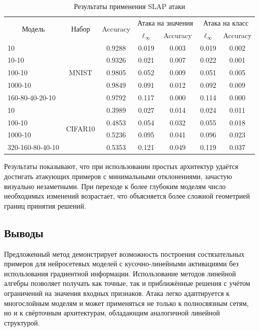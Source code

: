 \begin{table} [htbp]
\centering
\begin{threeparttable}
\caption{Результаты применения SLAP атаки}\label{tab:slap}
\begin{SingleSpace}
\begin{tabular}{|l|c|c|c|c|c|c|}
\hline
\multicolumn{1}{|c|}{\multirow{2}{*}{Модель}} &
\multicolumn{1}{|c|}{\multirow{2}{*}{Набор}} &
\multicolumn{1}{|c|}{\multirow{2}{*}{Accuracy}} &
\multicolumn{2}{c|}{Атака на значения} & \multicolumn{2}{c|}{Атака на класс} \\
\cline{4-7}
& & & \(\ell_\infty\) & Accuracy & \(\ell_\infty\) & Accuracy \\
\hline
10               & \multirow{5}{*}{MNIST} & 0.9288 & 0.019 & 0.003 & 0.019 & 0.002 \\
10-10            &                        & 0.9326 & 0.021 & 0.007 & 0.022 & 0.001 \\
100-10           &                        & 0.9805 & 0.052 & 0.009 & 0.051 & 0.005 \\
1000-10          &                        & 0.9849 & 0.091 & 0.012 & 0.092 & 0.009 \\
160-80-40-20-10  &                        & 0.9792 & 0.117 & 0.000 & 0.114 & 0.000 \\
\hline
10               & \multirow{4}{*}{CIFAR10} & 0.3989 & 0.027 & 0.014 & 0.024 & 0.011 \\
100-10           &                          & 0.4853 & 0.054 & 0.032 & 0.055 & 0.018 \\
1000-10          &                          & 0.5236 & 0.095 & 0.041 & 0.096 & 0.023 \\
320-160-80-40-10 &                          & 0.5353 & 0.121 & 0.049 & 0.119 & 0.037 \\
\hline
\end{tabular}
\end{SingleSpace}
\end{threeparttable}
\end{table}

Результаты показывают, что при использовании простых архитектур удаётся достигать атакующих примеров с минимальными отклонениями, зачастую визуально незаметными. При переходе к более глубоким моделям число необходимых изменений возрастает, что объясняется более сложной геометрией границ принятия решений.

\subsection{Выводы}

Предложенный метод демонстрирует возможность построения состязательных примеров для нейросетевых моделей с кусочно-линейными активациями без использования градиентной информации. Использование методов линейной алгебры позволяет получать как точные, так и приближённые решения с учётом ограничений на значения входных признаков. Атака легко адаптируется к многослойным моделям и может применяться не только к полносвязным сетям, но и к свёрточным архитектурам, обладающим аналогичной линейной структурой.
